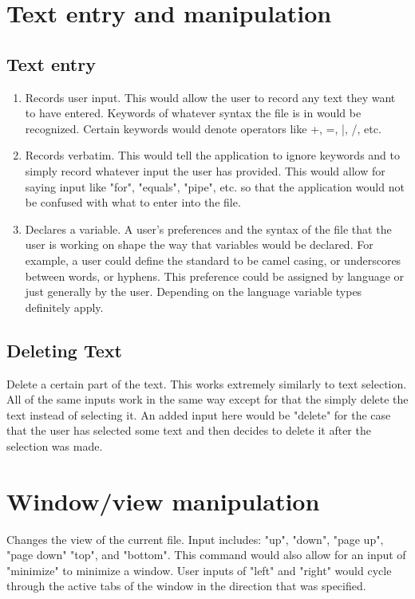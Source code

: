 \documentclass[11pt, oneside]{article}
\begin{document}
\section{Text entry and manipulation}

	\subsection{Text entry}
	\begin{enumerate}
	\item {}
	Records user input. This would allow the user to record any text they want to have entered. Keywords of whatever syntax the file is in would be recognized. Certain keywords would denote operators like +, =, |, /, etc. 

	\item {}
	Records verbatim. This would tell the application to ignore keywords and to simply record whatever input the user has provided. This would allow for saying input like "for", "equals", "pipe", etc. so that the application would not be confused with what to enter into the file.

	\item {}
	Declares a variable. A user's preferences and the syntax of the file that the user is working on shape the way that variables would be declared. For example, a user could define the standard to be camel casing, or underscores between words, or hyphens. This preference could be assigned by language or just generally by the user. Depending on the language variable types definitely apply.
	\end{enumerate}

	\subsection{Deleting Text}
	Delete a certain part of the text. This works extremely similarly to text selection. All of the same inputs work in the same way except for that the simply delete the text instead of selecting it. An added input here would be "delete" for the case that the user has selected some text and then decides to delete it after the selection was made.


\section{Window/view manipulation}

	Changes the view of the current file. Input includes: "up", "down", "page up", "page down" "top", and "bottom". This command would also allow for an input of "minimize" to minimize a window. User inputs of "left" and "right" would cycle through the active tabs of the window in the direction that was specified.
\end{document}
